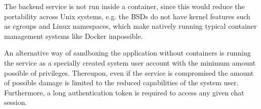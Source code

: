 The backend service is not run inside a container, since this would reduce the portability across Unix systems, e.g. the BSDs do not have kernel features such as cgroups and Linux namespaces, which make natively running typical container management systems like Docker impossible.

An alternative way of sandboxing the application without containers is running the service as a specially created system user account with the minimum amount possible of privileges. Thereupon, even if the service is compromised the amount of possible damage is limited to the reduced capabilities of the system user. Furthermore, a long authentication token is required to access any given chat session.